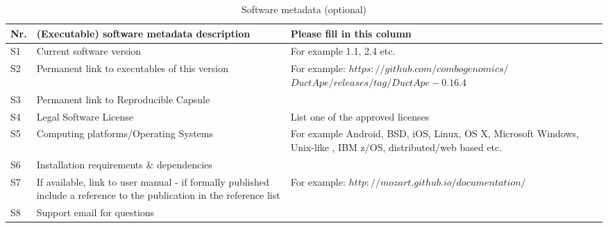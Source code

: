 \documentclass[preprint,12pt,letterpaper]{elsarticle}
\begin{document}
\begin{table}[!h]
\begin{tabular}{|l|p{6.5cm}|p{6.5cm}|}
\hline
\textbf{Nr.} & \textbf{(Executable) software metadata description} & \textbf{Please fill in this column} \\
\hline
S1 & Current software version & For example 1.1, 2.4 etc. \\
\hline
S2 & Permanent link to executables of this version  & For example: $https://github.com/combogenomics/$ $DuctApe/releases/tag/DuctApe-0.16.4$ \\
\hline
S3  & Permanent link to Reproducible Capsule & \\
\hline
S4 & Legal Software License & List one of the approved licenses \\
\hline
S5 & Computing platforms/Operating Systems & For example Android, BSD, iOS, Linux, OS X, Microsoft Windows, Unix-like , IBM z/OS, distributed/web based etc. \\
\hline
S6 & Installation requirements \& dependencies & \\
\hline
S7 & If available, link to user manual - if formally published include a reference to the publication in the reference list & For example: $http://mozart.github.io/documentation/$ \\
\hline
S8 & Support email for questions & \\
\hline
\end{tabular}
\caption{Software metadata (optional)}
\end{table}
\end{document}
